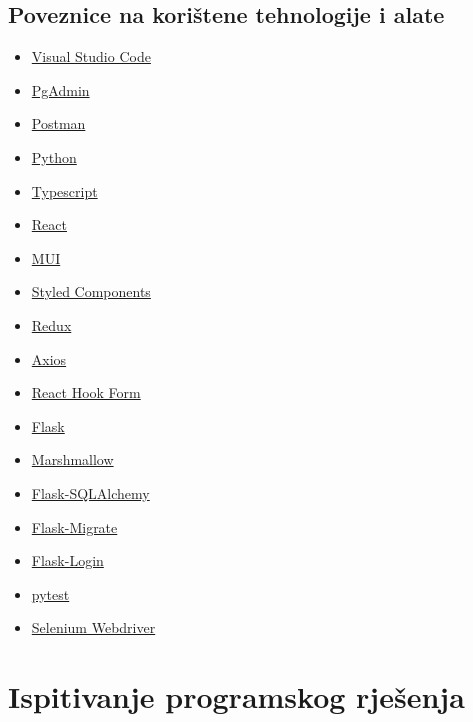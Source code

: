             \subsection{Poveznice na korištene tehnologije i alate}
            \begin{itemize}
                \item \href{https://code.visualstudio.com/}{Visual Studio Code}
                \item \href{https://www.pgadmin.org/}{PgAdmin}
                \item \href{https://www.postman.com/}{Postman}
                \item \href{https://www.python.org/}{Python}
                \item \href{https://www.typescriptlang.org/}{Typescript}
                \item \href{https://react.dev/}{React}
                \item \href{https://mui.com/}{MUI}
                \item \href{https://styled-components.com/}{Styled Components}
                \item \href{https://redux.js.org/}{Redux}
                \item \href{https://axios-http.com/docs/intro}{Axios}
                \item \href{https://react-hook-form.com/}{React Hook Form}
                \item \href{https://flask.palletsprojects.com/en/3.0.x/}{Flask}
                \item \href{https://marshmallow.readthedocs.io/en/stable/}{Marshmallow}
                \item \href{https://flask-sqlalchemy.palletsprojects.com/en/3.1.x/}{Flask-SQLAlchemy}
                \item \href{https://flask-migrate.readthedocs.io/en/latest/}{Flask-Migrate}
                \item \href{https://flask-login.readthedocs.io/en/latest/}{Flask-Login}
                \item \href{https://docs.pytest.org/en/7.4.x/}{pytest}
                \item \href{https://www.selenium.dev/documentation/webdriver/}{Selenium Webdriver}
              \end{itemize}
			\eject 
		
	
		\section{Ispitivanje programskog rješenja}
			
